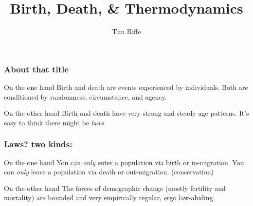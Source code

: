 \documentclass[20pt]{beamer}
\title{Birth, Death, \& Thermodynamics}
\subtitle{Tim Riffe}		%
\begin{document}

\begin{frame}
	\titlepage
\end{frame}

\begin{frame}
\frametitle{About that title}
\begin{block}{On the one hand}
Birth and death are events experienced by individuals. Both are conditioned by
randomness, circumstance, and agency.
\end{block}
\vspace{1em}
\begin{block}{On the other hand}
Birth and death have very strong and steady age patterns. It's easy to think
there might be \textit{laws}.
\end{block}
\end{frame}

\begin{frame}
\frametitle{Laws? two kinds:}
\begin{block}{On the one hand}
You can \textit{only} enter a population via birth or in-migration. You can \textit{only}
leave a population via death or out-migration. (conservation)
\end{block}
\begin{block}{On the other hand}
The forces of demographic change (mostly fertility and mortality) are bounded
and very empirically regular, ergo law-abiding.
\end{block}
\end{frame}
\end{document}
